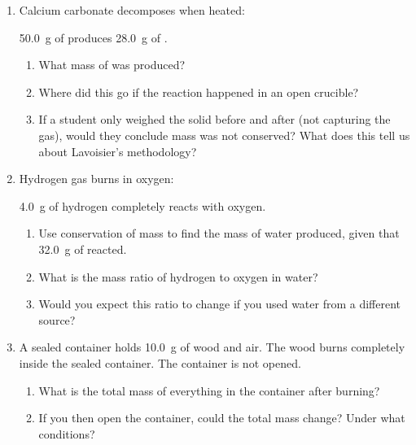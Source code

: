\documentclass[12pt, a4paper]{book}
\theoremstyle{definition}
\begin{document}
\begin{problembox}
\begin{enumerate}[label=\textbf{\arabic*.}]
  \item Calcium carbonate decomposes when heated:
        \begin{center}
        \end{center}
        \SI{50.0}{\gram} of  produces \SI{28.0}{\gram} of .
        \begin{enumerate}[label=(\alph*)]
          \item What mass of  was produced?
          \item Where did this  go if the reaction happened in an open crucible?
          \item If a student only weighed the solid before and after
                (not capturing the gas), would they conclude mass was not conserved?
                What does this tell us about Lavoisier's methodology?
        \end{enumerate}

  \item Hydrogen gas burns in oxygen:
        \begin{center}
        \end{center}
        \SI{4.0}{\gram} of hydrogen completely reacts with oxygen.
        \begin{enumerate}[label=(\alph*)]
          \item Use conservation of mass to find the mass
                of water produced, given that \SI{32.0}{\gram} of  reacted.
          \item What is the mass ratio of hydrogen to oxygen in water?
          \item Would you expect this ratio to change if you used
                water from a different source?
        \end{enumerate}

  \item A sealed container holds \SI{10.0}{\gram} of wood and air.
        The wood burns completely inside the sealed container.
        The container is not opened.
        \begin{enumerate}[label=(\alph*)]
          \item What is the total mass of everything in the container
                after burning?
          \item If you then open the container, could the total mass change?
                Under what conditions?
        \end{enumerate}
\end{enumerate}
\end{problembox}
\end{document}
